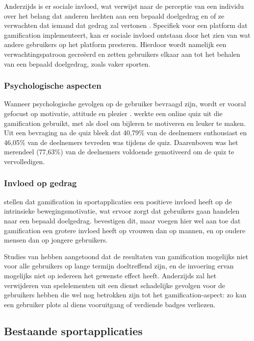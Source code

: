 Anderzijds is er sociale invloed, wat verwijst naar de perceptie van een individu over het belang dat anderen hechten aan een bepaald doelgedrag en of ze verwachten dat iemand dat gedrag zal vertonen \autocite{Ajzen1991}. Specifiek voor een platform dat gamification implementeert, kan er sociale invloed ontstaan door het zien van wat andere gebruikers op het platform presteren. Hierdoor wordt namelijk een verwachtingspatroon gecreëerd en zetten gebruikers elkaar aan tot het behalen van een bepaald doelgedrag, zoals vaker sporten.

\subsubsection{Psychologische aspecten}

Wanneer psychologische gevolgen op de gebruiker bevraagd zijn, wordt er vooral gefocust op motivatie, attitude en plezier \autocite{Hamari2014}. \textcite{Cheong2013} werkte een online quiz uit die gamification gebruikt, met als doel om bijleren te motiveren en leuker te maken. Uit een bevraging  na de quiz bleek dat 40,79\% van de deelnemers enthousiast en 46,05\% van de deelnemers tevreden was tijdens de quiz. Daarenboven was het merendeel (77,63\%) van de deelnemers voldoende gemotiveerd om de quiz te vervolledigen.

\subsubsection{Invloed op gedrag}

\textcite{Kari2016} stellen dat gamification in sportapplicaties een positieve invloed heeft op de intrinsieke bewegingsmotivatie, wat ervoor zorgt dat gebruikers gaan handelen naar een bepaald doelgedrag. \textcite{PoloPena2020} bevestigen dit, maar voegen hier wel aan toe dat gamification een grotere invloed heeft op vrouwen dan op mannen, en op oudere mensen dan op jongere gebruikers.

Studies van \textcite{Hamari2013a} hebben aangetoond dat de resultaten van gamification mogelijks niet voor alle gebruikers op lange termijn doeltreffend zijn, en de invoering ervan mogelijks niet op iedereen het gewenste effect heeft.
Anderzijds zal het verwijderen van spelelementen uit een dienst schadelijke gevolgen voor de gebruikers hebben die wel nog betrokken zijn tot het gamification-aspect: zo kan een gebruiker plots al diens vooruitgang of verdiende badges verliezen.

\subsection{Bestaande sportapplicaties}

